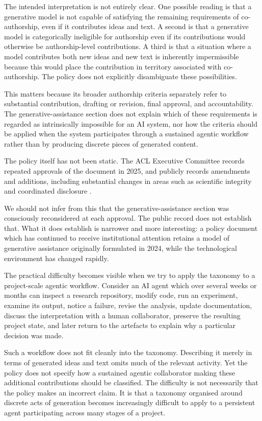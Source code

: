 \documentclass[12pt]{article}
\begin{document}
The intended interpretation is not entirely clear.
One possible reading is that a generative model is not capable of satisfying the remaining requirements of co-authorship, even if it contributes ideas and text. A second is that a generative model is categorically ineligible for authorship even if its contributions would otherwise be authorship-level contributions. A third is that a situation where a model contributes both new ideas and new text is inherently impermissible because this would place the contribution in territory associated with co-authorship.
The policy does not explicitly disambiguate these possibilities.

This matters because its broader authorship criteria separately refer to substantial contribution, drafting or revision, final approval, and accountability. The generative-assistance section does not explain which of these requirements is regarded as intrinsically impossible for an AI system, nor how the criteria should be applied when the system participates through a sustained agentic workflow rather than by producing discrete pieces of generated content.

The policy itself has not been static. The ACL Executive Committee records repeated approvals of the document in 2025, and publicly records amendments and additions, including substantial changes in areas such as scientific integrity and coordinated disclosure \citep{acl2026policy,aclresolutions2025}.

We should not infer from this that the generative-assistance section was consciously reconsidered at each approval. The public record does not establish that.
What it does establish is narrower and more interesting: a policy document which has continued to receive institutional attention retains a model of generative assistance originally formulated in 2024, while the technological environment has changed rapidly.

The practical difficulty becomes visible when we try to apply the taxonomy to a project-scale agentic workflow. Consider an AI agent which over several weeks or months can inspect a research repository, modify code, run an experiment, examine its output, notice a failure, revise the analysis, update documentation, discuss the interpretation with a human collaborator, preserve the resulting project state, and later return to the artefacts to explain why a particular decision was made.

Such a workflow does not fit cleanly into the taxonomy.
Describing it merely in terms of generated ideas and text omits much of the relevant activity. Yet the policy does not specify how a sustained agentic collaborator making these additional contributions should be classified.
The difficulty is not necessarily that the policy makes an incorrect claim. It is that a taxonomy organised around discrete acts of generation becomes increasingly difficult to apply to a persistent agent participating across many stages of a project.
\end{document}
